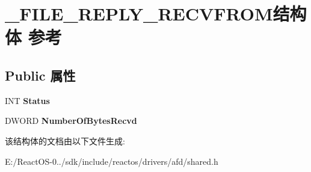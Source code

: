 \hypertarget{struct___f_i_l_e___r_e_p_l_y___r_e_c_v_f_r_o_m}{}\section{\+\_\+\+F\+I\+L\+E\+\_\+\+R\+E\+P\+L\+Y\+\_\+\+R\+E\+C\+V\+F\+R\+O\+M结构体 参考}
\label{struct___f_i_l_e___r_e_p_l_y___r_e_c_v_f_r_o_m}
\subsection*{Public 属性}
\begin{DoxyCompactItemize}
\item 
\mbox{\label{struct___f_i_l_e___r_e_p_l_y___r_e_c_v_f_r_o_m_a79c803f2cff4d79df5478961a3b9cb36}} 
I\+NT {\bfseries Status}
\item 
\mbox{\label{struct___f_i_l_e___r_e_p_l_y___r_e_c_v_f_r_o_m_a88c94edb94725d8209c2a82f9148b0e9}} 
D\+W\+O\+RD {\bfseries Number\+Of\+Bytes\+Recvd}
\end{DoxyCompactItemize}


该结构体的文档由以下文件生成\+:\begin{DoxyCompactItemize}
\item 
E\+:/\+React\+O\+S-\/0../sdk/include/reactos/drivers/afd/shared.\+h\end{DoxyCompactItemize}
